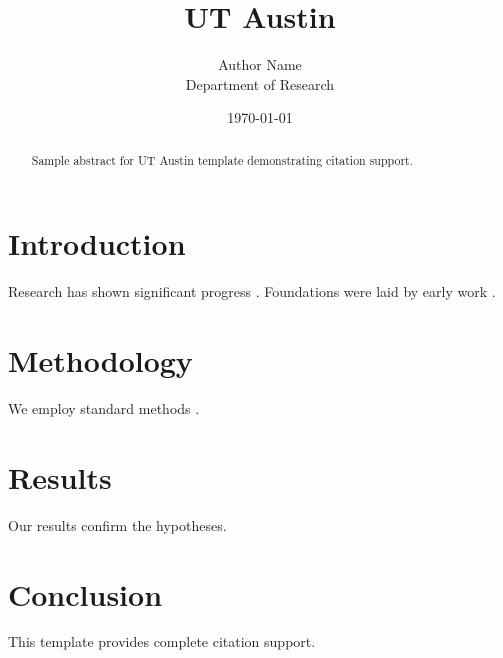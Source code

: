 \documentclass{thesis_utexas}
\title{UT Austin}
\author{Author Name \\ \small Department of Research}
\date{\today}
\begin{document}
\maketitle

\begin{abstract}
Sample abstract for UT Austin template demonstrating citation support.
\end{abstract}

\section{Introduction}
Research has shown significant progress \citep{einstein1905}. Foundations were laid by early work \citep{turing1950}.

\section{Methodology}
We employ standard methods \citep{knuth1984}.

\section{Results}
Our results confirm the hypotheses.

\section{Conclusion}
This template provides complete citation support.



\end{document}
